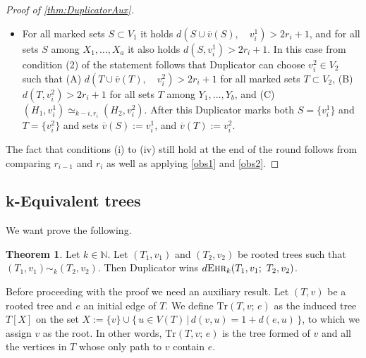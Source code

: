 \documentclass[12pt,notitlepage,a4paper]{article}
\theoremstyle{definition}
\newtheorem{theorem}{Theorem}[section]
\newcommand{\N}{\mathbb{N}}
\newcommand{\ehr}{\textsc{Ehr}}
\begin{document}
\begin{proof}[Proof of \cref{thm:DuplicatorAux}]
\begin{itemize}[leftmargin=*]
		Thus, by definition, for some orderings $\overline{w}$, 
		$\overline{z}$ of the vertices in $S$ and $T$ respectively
		it holds that Duplicator wins
		\[
		d\ehr_{k-i+1}\left( \,
		N(\overline{w};3r_i+1), \overline{w};
		\quad
		N(\overline{z};3r_i+1), \overline{z}
		\, \right).		
		\]
		Then Duplicator can choose $v^2_i\in V_2$ according 
		to a winning strategy for this game. After this Duplicator
		marks both $S$ and $T$ and sets 
		$\overline{v}(S):=v^1_i$, and 
		$\overline{v}(T):=v^2_i$. Notice
		that because of \cref{lemm:Duplicator} now
		\[
		\left(H_1, (S,\overline{v}(S))\right)\simeq_{k-i,r_i}
		\left(H_2, (T,\overline{v}(T))\right).
		\]
		\item For all marked sets $S\subset V_1$ it holds
		$d(S\cup \overline{v}(S), \quad v^1_i)>2r_i +1$, and
		for all sets $S$ among $X_1,\dots, X_a$ it also holds
		$d(S,v^1_i)> 2r_i+1$. In this case
		from condition (2) of the statement follows that
		Duplicator can choose
		$v^2_i\in V_2$ such that
		(A)
		$d(T\cup \overline{v}(T),\quad v^2_i)>2r_i+1$ for all
		marked sets $T\subset V_2$, (B)
		$d(T, v^2_i)> 2r_i+1$ for all sets $T$ among
		$Y_1,\dots, Y_b$, and (C) 
		$(H_1,v^1_i)\simeq_{k-i,r_i} (H_2, v^2_i)$.
		After this Duplicator marks both $S=\{
		v^1_i\}$ and $T=\{v^2_i\}$ and sets
		$\overline{v}(S):=v^1_i$, and
		$\overline{v}(T):=v^2_i$. 		
	\end{itemize}	 
	The fact that conditions
	(i) to (iv) still hold at the end of the round
	follows from comparing $r_{i-1}$ and $r_{i}$ as well 
	as applying \cref{obs1} and \cref{obs2}.

\end{proof}




\subsection{k-Equivalent trees} \label{sect:equivtrees}



We want prove the following.

\begin{theorem} \label{thm:equivalenttrees} 
	Let $k\in \N$. 
	Let $(T_1,v_1)$ and $(T_2,v_2)$ be rooted trees such
	that $(T_1,v_1)\sim_k (T_2,v_2)$.
	Then Duplicator wins
	$d\ehr_{k}(T_1,v_1;\, \, T_2,v_2)$.
\end{theorem}

Before proceeding with the proof we need  an auxiliary
result. Let $(T,v)$ be a rooted tree and $e$ an 
initial edge of $T$. We define $\mathrm{Tr}(T,v;\, e)$ as
the induced tree $T[X]$ on the set
$X:=\{v\} \cup \{\, u\in V(T) \, | \, d(v,u) = 1 + d(e,u) \,\}$,
to which we assign $v$ as the root. In other words, 
$\mathrm{Tr}\left(T,v;\, e\right)$ is the tree formed of 
$v$ and all the vertices
in $T$ whose only path to $v$ contain $e$. 
\end{document}
